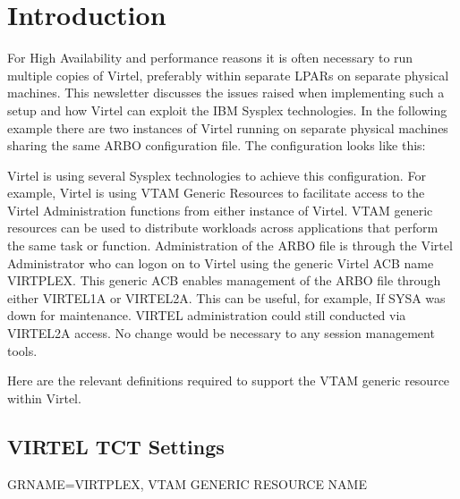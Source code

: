 \documentclass[letterpaper,10pt,english]{sphinxmanual}
\begin{document}
\section{Introduction}
\label{\detokenize{connectivity_guide:id77}}
\sphinxAtStartPar
For High Availability and performance reasons it is often necessary to run multiple copies of Virtel, preferably within separate LPARs on separate physical machines. This newsletter discusses the issues raised when implementing such a setup and how Virtel can exploit the IBM Sysplex technologies. In the following example there are two instances of Virtel running on separate physical machines sharing the same ARBO configuration file. The configuration looks like this:\sphinxhyphen{}

\sphinxAtStartPar
{}

\sphinxAtStartPar
Virtel is using several Sysplex technologies to achieve this configuration. For example, Virtel is using VTAM Generic Resources to facilitate access to the Virtel Administration functions from either instance of Virtel. VTAM generic resources can be used to distribute workloads across applications that perform the same task or function. Administration of the ARBO file is through the Virtel Administrator who can logon on to Virtel using the generic Virtel ACB name VIRTPLEX. This generic ACB enables management of the ARBO file through either VIRTEL1A or VIRTEL2A. This can be useful, for example, If SYSA was down for maintenance. VIRTEL administration could still conducted via VIRTEL2A access. No change would be necessary to any session management tools.

\sphinxAtStartPar
Here are the relevant definitions required to support the VTAM generic resource within Virtel.

\ignorespaces 

\subsection{VIRTEL TCT Settings}
\label{\detokenize{connectivity_guide:virtel-tct-settings}}\label{\detokenize{connectivity_guide:index-176}}
\sphinxAtStartPar
GRNAME=VIRTPLEX, VTAM GENERIC RESOURCE NAME

\ignorespaces 
\end{document}
